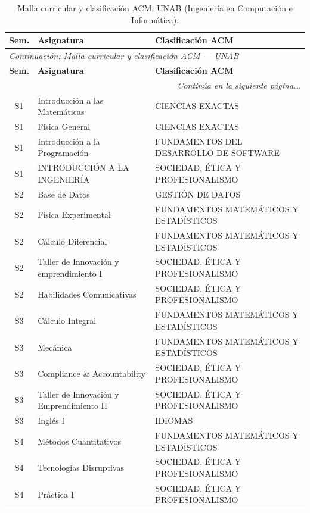\documentclass[11pt,a4paper]{article}
\begin{document}
\begin{small}
\begin{longtable}{c >{\raggedright\arraybackslash}p{8.5cm} >{\raggedright\arraybackslash}p{5.5cm}}
\caption{Malla curricular y clasificación ACM: UNAB (Ingeniería en Computación e Informática).} \label{tab:UNAB04} \\
\toprule
\textbf{Sem.} & \textbf{Asignatura} & \textbf{Clasificación ACM} \\
\midrule
\endfirsthead
\multicolumn{3}{l}{\small\textit{Continuación: Malla curricular y clasificación ACM --- UNAB}} \\[3pt]
\toprule
\textbf{Sem.} & \textbf{Asignatura} & \textbf{Clasificación ACM} \\
\midrule
\endhead
\midrule
\multicolumn{3}{r}{\small\textit{Continúa en la siguiente página...}} \\
\endfoot
\bottomrule
\endlastfoot
S1 & Introducción a las Matemáticas & CIENCIAS EXACTAS \\
S1 & Física General & CIENCIAS EXACTAS \\
S1 & Introducción a la Programación & FUNDAMENTOS DEL DESARROLLO DE SOFTWARE \\
S1 & INTRODUCCIÓN A LA INGENIERÍA & SOCIEDAD, ÉTICA Y PROFESIONALISMO \\
S2 & Base de Datos & GESTIÓN DE DATOS \\
S2 & Física Experimental & FUNDAMENTOS MATEMÁTICOS Y ESTADÍSTICOS \\
S2 & Cálculo Diferencial & FUNDAMENTOS MATEMÁTICOS Y ESTADÍSTICOS \\
S2 & Taller de Innovación y emprendimiento I & SOCIEDAD, ÉTICA Y PROFESIONALISMO \\
S2 & Habilidades Comunicativas & SOCIEDAD, ÉTICA Y PROFESIONALISMO \\
S3 & Cálculo Integral & FUNDAMENTOS MATEMÁTICOS Y ESTADÍSTICOS \\
S3 & Mecánica & FUNDAMENTOS MATEMÁTICOS Y ESTADÍSTICOS \\
S3 & Compliance \& Accountability & SOCIEDAD, ÉTICA Y PROFESIONALISMO \\
S3 & Taller de Innovación y Emprendimiento II & SOCIEDAD, ÉTICA Y PROFESIONALISMO \\
S3 & Inglés I & IDIOMAS \\
S4 & Métodos Cuantitativos & FUNDAMENTOS MATEMÁTICOS Y ESTADÍSTICOS \\
S4 & Tecnologías Disruptivas & SOCIEDAD, ÉTICA Y PROFESIONALISMO \\
S4 & Práctica I & SOCIEDAD, ÉTICA Y PROFESIONALISMO \\

\end{longtable}
\end{small}
\end{document}

